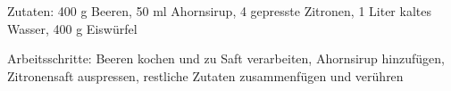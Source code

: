 Zutaten:
400 g Beeren, 50 ml Ahornsirup, 4 gepresste Zitronen, 1 Liter kaltes Wasser, 400 g Eiswürfel

\noindent Arbeitsschritte: Beeren kochen und zu Saft verarbeiten, Ahornsirup hinzufügen, Zitronensaft auspressen, restliche Zutaten zusammenfügen und verühren